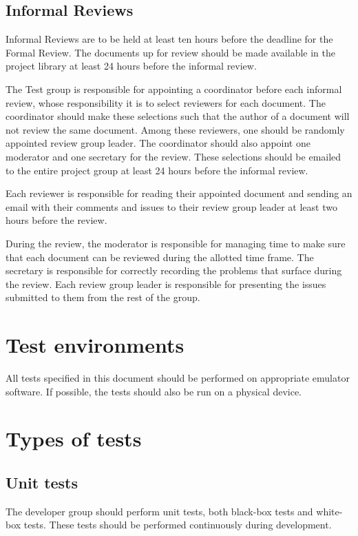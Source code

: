 \documentclass[a4paper]{article}
\begin{document}
\subsection{Informal Reviews}
Informal Reviews are to be held at least ten hours before the deadline for the Formal Review. The documents up for review should be made available in the project library at least 24 hours before the informal review.

The Test group is responsible for appointing a coordinator before each informal review, whose responsibility it is to select reviewers for each document. The coordinator should make these selections such that the author of a document will not review the same document. Among these reviewers, one should be randomly appointed review group leader. The coordinator should also appoint one moderator and one secretary for the review. These selections should be emailed to the entire project group at least 24 hours before the informal review.

Each reviewer is responsible for reading their appointed document and sending an email with their comments and issues to their review group leader at least two hours before the review.

During the review, the moderator is responsible for managing time to make sure that each document can be reviewed during the allotted time frame. The secretary is responsible for correctly recording the problems that surface during the review. Each review group leader is responsible for presenting the issues submitted to them from the rest of the group.

\section{Test environments}
All tests specified in this document should be performed on appropriate emulator software. If possible, the tests should also be run on a physical device.

\section{Types of tests}

\subsection{Unit tests}
The developer group should perform unit tests, both black-box tests and white-box tests. These tests should be performed continuously during development.
\end{document}
